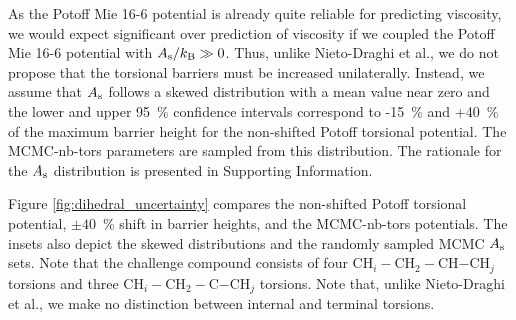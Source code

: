 \documentclass[preprint,review,12pt]{elsarticle}
\begin{document}
	
	As the Potoff Mie 16-6 potential is already quite reliable for predicting viscosity, we would expect significant over prediction of viscosity if we coupled the Potoff Mie 16-6 potential with $A_{\rm s}/k_{\rm B} \gg 0 $. Thus, unlike Nieto-Draghi et al., we do not propose that the torsional barriers must be increased unilaterally. Instead, we assume that $A_{\rm s}$ follows a skewed distribution with a mean value near zero and the lower and upper 95~\% confidence intervals correspond to -15~\% and +40~\% of the maximum barrier height for the non-shifted Potoff torsional potential. The MCMC-nb-tors parameters are sampled from this distribution. The rationale for the $A_{\rm s}$ distribution is presented in Supporting Information. 
	
	
	Figure \ref{fig:dihedral_uncertainty} compares the non-shifted Potoff torsional potential, $\pm 40$~\% shift in barrier heights, and the MCMC-nb-tors potentials. The insets also depict the skewed distributions and the randomly sampled MCMC $A_{\rm s}$ sets. Note that the challenge compound consists of four CH$_i-$CH$_2-$CH$-$CH$_j$ torsions and three CH$_i-$CH$_2-$C$-$CH$_j$ torsions. Note that, unlike Nieto-Draghi et al., we make no distinction between internal and terminal torsions.
	
	
	
\end{document}
